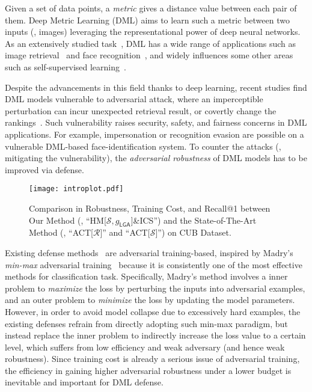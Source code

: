 \documentclass[10pt,twocolumn,letterpaper]{article}
\begin{document}

Given a set of data points, a \emph{metric} gives a distance value between each
pair of them.
%
Deep Metric Learning (DML) aims to learn such a metric between two inputs (\eg,
images) leveraging the representational power of deep neural networks.
%
As an extensively studied task~\cite{revisiting,dmlreality}, DML has a wide
range of applications such as image retrieval~\cite{imagesim2} and face
recognition~\cite{facenet,domainface}, and widely influences some other areas
such as self-supervised learning~\cite{dmlreality}.

Despite the advancements in this field thanks to deep learning, recent studies
find DML models vulnerable to adversarial attack, where an imperceptible
perturbation can incur unexpected retrieval result, or covertly change the
rankings~\cite{advrank,advorder}.
%
Such vulnerability raises security, safety, and fairness concerns in DML
applications.
%
For example, impersonation or recognition evasion are possible on a vulnerable
DML-based face-identification system.
%
To counter the attacks (\ie, mitigating the vulnerability), the
\emph{adversarial robustness} of DML models has to be improved via defense.

\begin{figure}[t]
	\texttt{[image: introplot.pdf]}
	\caption{
		Comparison in Robustness, Training Cost, and Recall@1 
		between Our Method (\ie, ``HM[$\mathcal{S},g_\mathsf{LGA}$]\&ICS'')
		and the State-of-The-Art Method (\ie, ``ACT[$\mathcal{R}$]'' and
		``ACT[$\mathcal{S}$]'') on CUB Dataset.
	}
	\label{fig:introplot}
\end{figure}


Existing defense methods~\cite{advrank,robrank} are adversarial training-based,
inspired by Madry's \emph{min-max} adversarial training~\cite{madry} because it
is consistently one of the most effective methods for classification task.
%
Specifically, Madry's method involves a inner problem to \emph{maximize} the
loss by perturbing the inputs into adversarial examples, and an outer problem
to \emph{minimize} the loss by updating the model parameters.
%
However, in order to avoid model collapse due to excessively hard examples, the
existing defenses refrain from directly adopting such min-max paradigm, but
instead replace the inner problem to indirectly increase the loss value to a
certain level, which suffers from low efficiency and weak adversary (and hence
weak robustness).
%
Since training cost is already a serious issue of adversarial training, the
efficiency in gaining higher adversarial robustness under a lower budget is
inevitable and important for DML defense.
\end{document}

